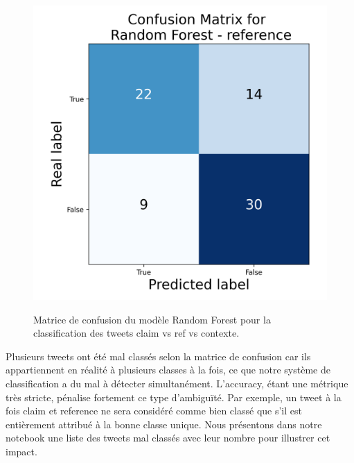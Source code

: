 \begin{figure}[h]
\begin{minipage}[b]{0.3\textwidth}
        \label{fig:confusion_3_2}
    \end{minipage}
    \hspace{1em}
    \begin{minipage}[b]{0.3\textwidth}
        \centering
        \includegraphics[width=\textwidth]{images/confusion_3.json-Random Forest_reference_confusion_matrix}
        \label{fig:confusion_3_3}
    \end{minipage}
    \caption{Matrice de confusion du modèle Random Forest pour la classification des tweets claim vs ref vs contexte.}
    \label{fig:confusion_3}
\end{figure}

Plusieurs tweets ont été mal classés selon la matrice de confusion car ils appartiennent en réalité à plusieurs classes à la fois, ce que notre système de classification a du mal à détecter simultanément.
L’accuracy, étant une métrique très stricte, pénalise fortement ce type d’ambiguïté.
Par exemple, un tweet à la fois claim et reference ne sera considéré comme bien classé que s’il est entièrement attribué à la bonne classe unique.
Nous présentons dans notre notebook une liste des tweets mal classés avec leur nombre pour illustrer cet impact.
